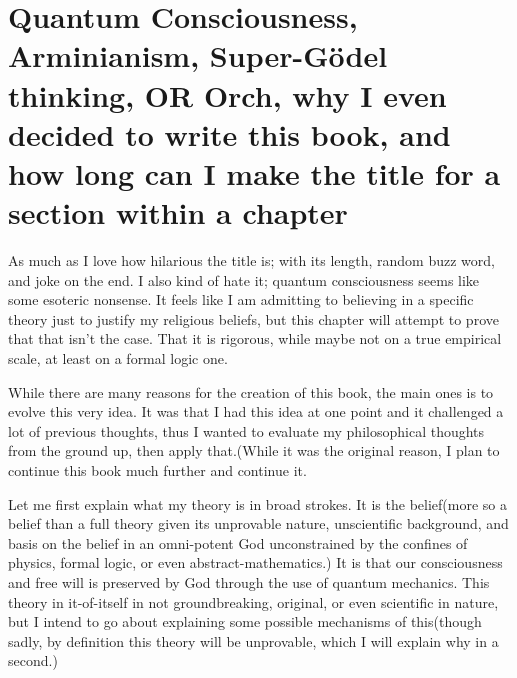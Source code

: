 \section{Quantum Consciousness,  \\ Arminianism, Super-Gödel \\ thinking, OR Orch, why I even decided to write this book, and how long can I make the title for a section within a chapter}
\par As much as I love how hilarious the title is; with its length, random buzz word, and joke on the end. I also kind of hate it; quantum consciousness seems like some esoteric nonsense. It feels like I am admitting to believing in a specific theory just to justify my religious beliefs, but this chapter will attempt to prove that that isn't the case. That it is rigorous, while maybe not on a true empirical scale, at least on a formal logic one.
\par While there are many reasons for the creation of this book, the main ones is to evolve this very idea. It was that I had this idea at one point and it challenged a lot of previous thoughts, thus I wanted to evaluate my philosophical thoughts from the ground up, then apply that.(While it was the original reason, I plan to continue this book much further and continue it.
\par Let me first explain what my theory is in broad strokes. It is the belief(more so a belief than a full theory given its unprovable nature, unscientific background, and basis on the belief in an omni-potent God unconstrained by the confines of physics, formal logic, or even abstract-mathematics.) It is that our consciousness and free will is preserved by God through the use of quantum mechanics. This theory in it-of-itself in not groundbreaking, original, or even scientific in nature, but I intend to go about explaining some possible mechanisms of this(though sadly, by definition this theory will be unprovable, which I will explain why in a second.)
